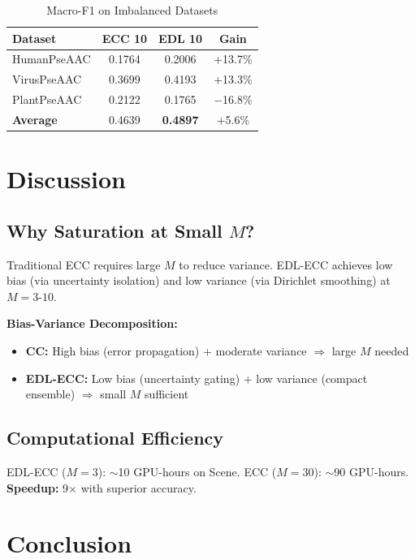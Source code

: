 \documentclass[conference]{IEEEtran}
\begin{document}
\begin{table}[t]
\centering
\caption{Macro-F1 on Imbalanced Datasets}
\label{tab:macro}
\small
\begin{tabular}{lccc}
\toprule
\textbf{Dataset} & \textbf{ECC 10} & \textbf{EDL 10} & \textbf{Gain} \\
\midrule
HumanPseAAC & 0.1764 & 0.2006 & +13.7\% \\
VirusPseAAC & 0.3699 & 0.4193 & +13.3\% \\
PlantPseAAC & 0.2122 & 0.1765 & $-$16.8\% \\
\midrule
\textbf{Average} & 0.4639 & \textbf{0.4897} & +5.6\% \\
\bottomrule
\end{tabular}
\end{table}

\section{Discussion}

\subsection{Why Saturation at Small $M$?}

Traditional ECC requires large $M$ to reduce variance. EDL-ECC achieves low bias (via uncertainty isolation) and low variance (via Dirichlet smoothing) at $M=3$-$10$.

\textbf{Bias-Variance Decomposition:}
\begin{itemize}
\item \textbf{CC:} High bias (error propagation) + moderate variance $\Rightarrow$ large $M$ needed
\item \textbf{EDL-ECC:} Low bias (uncertainty gating) + low variance (compact ensemble) $\Rightarrow$ small $M$ sufficient
\end{itemize}

\subsection{Computational Efficiency}

EDL-ECC ($M=3$): $\sim$10 GPU-hours on Scene.
ECC ($M=30$): $\sim$90 GPU-hours.
\textbf{Speedup:} 9$\times$ with superior accuracy.

\section{Conclusion}
\end{document}
